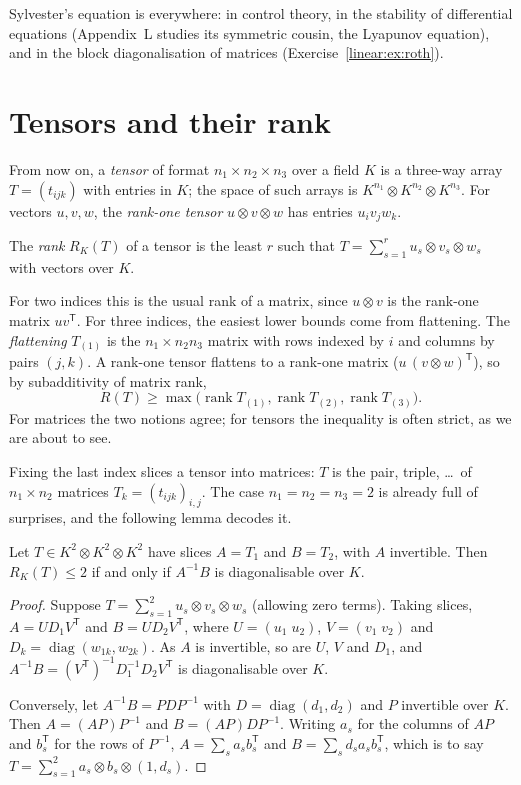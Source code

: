 Sylvester's equation is everywhere: in control theory, in the stability of differential equations (Appendix~L
studies its symmetric cousin, the Lyapunov equation), and in the block diagonalisation of matrices (Exercise~\ref{linear:ex:roth}).

\section{Tensors and their rank}

From now on, a \emph{tensor} of format $n_1\times n_2\times n_3$ over a field $K$ is a three-way array $T=(t_{ijk})$ with entries in
$K$; the space of such arrays is $K^{n_1}\otimes K^{n_2}\otimes K^{n_3}$. For vectors $u,v,w$, the \emph{rank-one tensor}
$u\otimes v\otimes w$ has entries $u_iv_jw_k$.

\begin{definition}\label{linear:def:tensorrank}
The \emph{rank} $R_K(T)$ of a tensor is the least $r$ such that $T=\sum_{s=1}^ru_s\otimes v_s\otimes w_s$ with vectors over $K$.
\end{definition}

For two indices this is the usual rank of a matrix, since $u\otimes v$ is the rank-one matrix $uv^{\mathsf T}$. For three indices, the
easiest lower bounds come from flattening. The \emph{flattening} $T_{(1)}$ is the $n_1\times n_2n_3$ matrix with rows indexed by $i$
and columns by pairs $(j,k)$. A rank-one tensor flattens to a rank-one matrix ($u\,(v\otimes w)^{\mathsf T}$), so by subadditivity of
matrix rank,
\[
R(T)\ge\max\bigl(\operatorname{rank}T_{(1)},\operatorname{rank}T_{(2)},\operatorname{rank}T_{(3)}\bigr).
\]
For matrices the two notions agree; for tensors the inequality is often strict, as we are about to see.

Fixing the last index slices a tensor into matrices: $T$ is the pair, triple, \dots\ of $n_1\times n_2$ matrices $T_k=(t_{ijk})_{i,j}$.
The case $n_1=n_2=n_3=2$ is already full of surprises, and the following lemma decodes it.

\begin{lemma}\label{linear:lem:slices}
Let $T\in K^2\otimes K^2\otimes K^2$ have slices $A=T_1$ and $B=T_2$, with $A$ invertible. Then $R_K(T)\le2$ if and only if $A^{-1}B$
is diagonalisable over $K$.
\end{lemma}
\begin{proof}
Suppose $T=\sum_{s=1}^2u_s\otimes v_s\otimes w_s$ (allowing zero terms). Taking slices, $A=UD_1V^{\mathsf T}$ and $B=UD_2V^{\mathsf T}$, where
$U=(u_1\;u_2)$, $V=(v_1\;v_2)$ and $D_k=\operatorname{diag}(w_{1k},w_{2k})$. As $A$ is invertible, so are $U$, $V$ and $D_1$, and
$A^{-1}B=(V^{\mathsf T})^{-1}D_1^{-1}D_2V^{\mathsf T}$ is diagonalisable over $K$.

Conversely, let $A^{-1}B=PDP^{-1}$ with $D=\operatorname{diag}(d_1,d_2)$ and $P$ invertible over $K$. Then $A=(AP)P^{-1}$ and $B=(AP)D
P^{-1}$. Writing $a_s$ for the columns of $AP$ and $b_s^{\mathsf T}$ for the rows of $P^{-1}$, $A=\sum_sa_sb_s^{\mathsf T}$ and $B=\sum_sd_sa_s
b_s^{\mathsf T}$, which is to say $T=\sum_{s=1}^2a_s\otimes b_s\otimes(1,d_s)$.
\end{proof}

